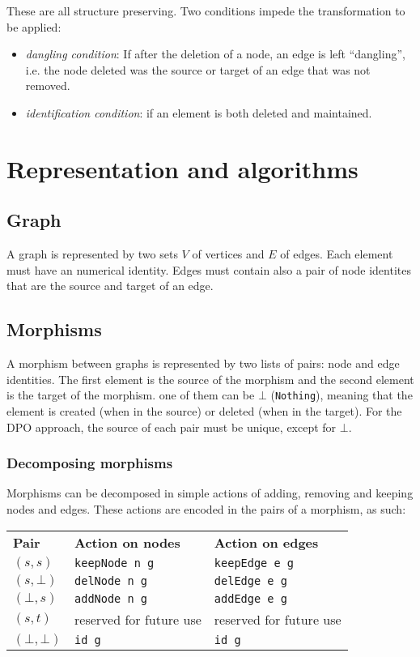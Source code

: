 \documentclass[a4paper]{report}
\begin{document}
These are all structure preserving. Two conditions impede the transformation to be applied:
\begin{itemize}
	\item \textit{dangling condition}: If after the deletion of a node, an edge is left ``dangling'', i.e. the node deleted was the source or target of an edge that was not removed.
	\item \textit{identification condition}: if an element is both deleted and maintained.
\end{itemize}

\chapter{Representation and algorithms}
\section{Graph}
A graph is represented by two sets $V$ of vertices and $E$ of edges. Each element must have an numerical identity. Edges must contain also a pair of node identites that are the source and target of an edge.

\section{Morphisms}
A morphism between graphs is represented by two lists of pairs: node and edge identities. The first element is the source of the morphism and the second element is the target of the morphism. one of them can be $\bot$ (\texttt{Nothing}), meaning that the element is created (when in the source) or deleted (when in the target). For the DPO approach, the source of each pair must be unique, except for $\bot$. 

\subsection{Decomposing morphisms}
\label{ssec:actions}
Morphisms can be decomposed in simple actions of adding, removing and keeping nodes and edges. These actions are encoded in the pairs of a morphism, as such:

\begin{tabular}{lll}
\textbf{Pair} & \textbf{Action on nodes} & \textbf{Action on edges} \\
$(s, s)$ & \texttt{keepNode n g} & \texttt{keepEdge e g} \\
$(s, \bot)$ & \texttt{delNode n g} & \texttt{delEdge e g} \\
$(\bot, s)$ & \texttt{addNode n g} & \texttt{addEdge e g} \\
$(s, t)$ & reserved for future use & reserved for future use \\
$(\bot, \bot)$ & \texttt{id g} & \texttt{id g} \\
\end{tabular}
\end{document}
